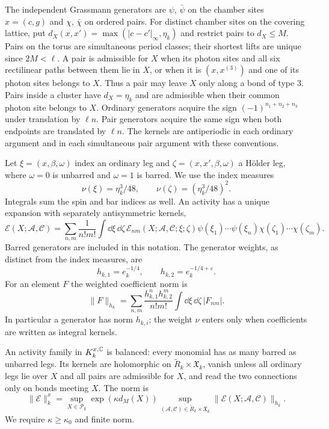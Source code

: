 The independent Grassmann generators are $\psi$, $\bar\psi$ on
the chamber sites $x=(c,g)$ and $\chi$, $\bar\chi$ on ordered
pairs. For distinct chamber sites on the covering lattice, put
$d_X(x,x')=\max(|c-c'|_\infty,\eta_k)$ and restrict pairs to
$d_X\le M$. Pairs on the torus are simultaneous period classes;
their shortest lifts are unique since $2M<\ell$. A pair is
admissible for $X$ when its photon sites and all six rectilinear
paths between them lie in $X$, or when it is $(x,x^{(3)})$ and
one of its photon sites belongs to $X$.
Thus a pair may leave $X$ only along a bond of type $3$.
Pairs inside a cluster have $d_X=\eta_k$ and are admissible when
their common photon site belongs to $X$.
Ordinary generators acquire the sign $(-1)^{n_1+n_2+n_3}$
under translation by $\ell n$. Pair generators acquire the same
sign when both endpoints are translated by $\ell n$.
The kernels are antiperiodic in each ordinary argument and in
each simultaneous pair argument with these conventions.

Let $\xi=(x,\beta,\omega)$ index an ordinary leg and
$\zeta=(x,x',\beta,\omega)$ a H\"older leg, where
$\omega=0$ is unbarred and $\omega=1$ is barred.
We use the index measures
\[
 \nu(\xi)=\eta_k^3/48,\qquad
 \nu(\zeta)=(\eta_k^3/48)^2.
\]
Integrals sum the spin and bar indices as well. An activity
has a unique expansion with separately antisymmetric kernels,
\begin{equation}\label{eq:rg-activity-kernels}
 \mathscr E(X;\mathscr A,\mathscr C)
 =\sum_{n,m}\frac1{n!m!}\int\dd\xi\,\dd\zeta\,
      \mathscr E_{nm}(X;\mathscr A,\mathscr C;\xi;\zeta)
                       \psi(\xi_1)\cdots\psi(\xi_n)
                       \chi(\zeta_1)\cdots\chi(\zeta_m).
\end{equation}
Barred generators are included in this notation.
The generator weights, as distinct from the index measures, are
\[
 h_{k,1}=e_k^{-1/4},\qquad h_{k,2}=e_k^{-1/4+\varepsilon}.
\]
For an element $F$ the weighted coefficient norm is
\begin{equation}\label{eq:rg-activity-coefficient-norm}
 \|F\|_{h_k}
       =\sum_{n,m}\frac{h_{k,1}^nh_{k,2}^m}{n!m!}
                                   \int\dd\xi\,\dd\zeta\,|F_{nm}|.
\end{equation}
In particular a generator has norm $h_{k,i}$;
the weight $\nu$ enters only when coefficients are written as
integral kernels.

An activity family in $K_k^{x,\mathbb C}$ is balanced: every monomial
has as many barred as unbarred legs. Its kernels are holomorphic
on $\widetilde R_k\times\mathfrak X_k$, vanish unless all ordinary
legs lie over $X$ and all pairs are admissible for $X$, and read
the two connections only on bonds meeting $X$. The norm is
\begin{equation}\label{eq:rg-activity-norm}
 \|\mathscr E\|_k^x
  =\sup_{X\in\mathcal P_k}\exp(\kappa d_M(X))
    \sup_{(\mathscr A,\mathscr C)\in\widetilde R_k\times\mathfrak X_k}
                          \|\mathscr E(X;\mathscr A,\mathscr C)\|_{h_k}.
\end{equation}
We require $\kappa\ge\kappa_0$ and finite norm.

